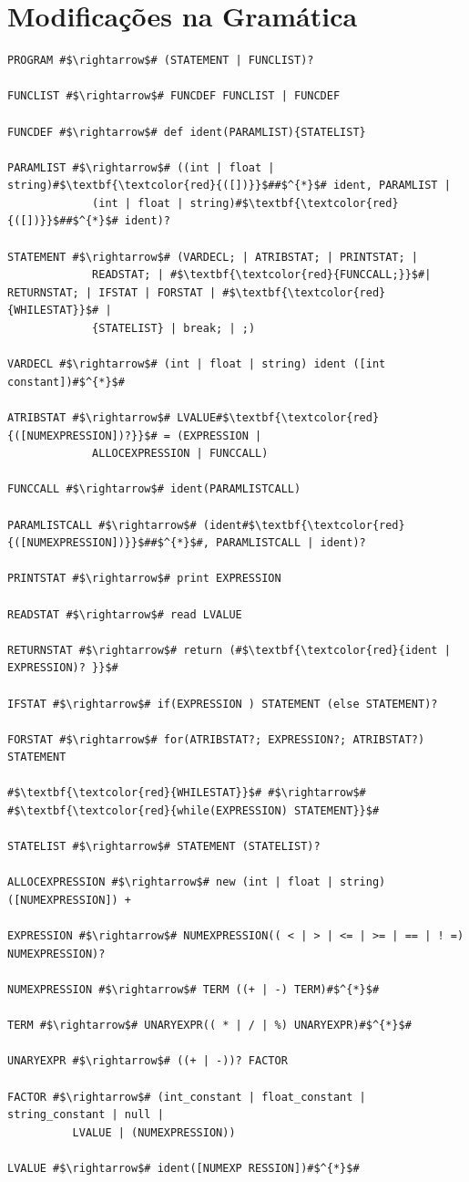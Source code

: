 \documentclass[
	12pt,				%
	openright,			%
	twoside,			%
	a4paper,			%
	english,			%
	french,				%
	spanish,			%
	brazil				%
	]{abntex2}
\begin{document}
\section{Modificações na Gramática}
\begin{lstlisting}[escapechar=\#]
PROGRAM #$\rightarrow$# (STATEMENT | FUNCLIST)?  

FUNCLIST #$\rightarrow$# FUNCDEF FUNCLIST | FUNCDEF  

FUNCDEF #$\rightarrow$# def ident(PARAMLIST){STATELIST}  

PARAMLIST #$\rightarrow$# ((int | float | string)#$\textbf{\textcolor{red}{([])}}$##$^{*}$# ident, PARAMLIST |
             (int | float | string)#$\textbf{\textcolor{red}{([])}}$##$^{*}$# ident)?  

STATEMENT #$\rightarrow$# (VARDECL; | ATRIBSTAT; | PRINTSTAT; |
             READSTAT; | #$\textbf{\textcolor{red}{FUNCCALL;}}$#| RETURNSTAT; | IFSTAT | FORSTAT | #$\textbf{\textcolor{red}{WHILESTAT}}$# |
             {STATELIST} | break; | ;) 

VARDECL #$\rightarrow$# (int | float | string) ident ([int constant])#$^{*}$#  

ATRIBSTAT #$\rightarrow$# LVALUE#$\textbf{\textcolor{red}{([NUMEXPRESSION])?}}$# = (EXPRESSION |
             ALLOCEXPRESSION | FUNCCALL)  

FUNCCALL #$\rightarrow$# ident(PARAMLISTCALL)  

PARAMLISTCALL #$\rightarrow$# (ident#$\textbf{\textcolor{red}{([NUMEXPRESSION])}}$##$^{*}$#, PARAMLISTCALL | ident)?  

PRINTSTAT #$\rightarrow$# print EXPRESSION  

READSTAT #$\rightarrow$# read LVALUE  

RETURNSTAT #$\rightarrow$# return (#$\textbf{\textcolor{red}{ident | EXPRESSION)? }}$#

IFSTAT #$\rightarrow$# if(EXPRESSION ) STATEMENT (else STATEMENT)?  

FORSTAT #$\rightarrow$# for(ATRIBSTAT?; EXPRESSION?; ATRIBSTAT?) STATEMENT  

#$\textbf{\textcolor{red}{WHILESTAT}}$# #$\rightarrow$#  #$\textbf{\textcolor{red}{while(EXPRESSION) STATEMENT}}$#  

STATELIST #$\rightarrow$# STATEMENT (STATELIST)?  

ALLOCEXPRESSION #$\rightarrow$# new (int | float | string) ([NUMEXPRESSION]) +  

EXPRESSION #$\rightarrow$# NUMEXPRESSION(( < | > | <= | >= | == | ! =) NUMEXPRESSION)?  

NUMEXPRESSION #$\rightarrow$# TERM ((+ | -) TERM)#$^{*}$#  

TERM #$\rightarrow$# UNARYEXPR(( * | / | %) UNARYEXPR)#$^{*}$#  

UNARYEXPR #$\rightarrow$# ((+ | -))? FACTOR  

FACTOR #$\rightarrow$# (int_constant | float_constant | string_constant | null |
          LVALUE | (NUMEXPRESSION))  

LVALUE #$\rightarrow$# ident([NUMEXP RESSION])#$^{*}$# 
\end{lstlisting}
\end{document}
